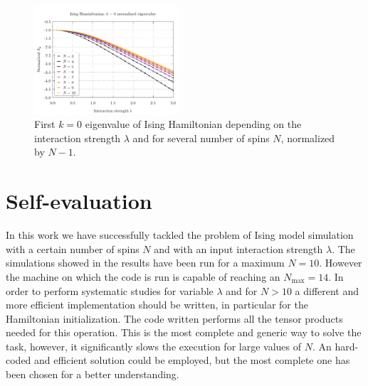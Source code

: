 \documentclass[pra, onecolumn, notitlepage, floats, 11pt]{revtex4-1}
\begin{document}
\begin{figure}[!h]
    \centering
    \includegraphics[width=0.48\textwidth]{images/ising_0_K.pdf}
    \caption{First \( k = 0 \) eigenvalue of Ising Hamiltonian depending on the interaction strength \( \lambda \) and for several number of spins \( N \), normalized by \( N - 1 \).}
    \label{fig:09_R_5}
\end{figure}





\section{Self-evaluation}
In this work we have successfully tackled the problem of Ising model simulation with a certain number of spins \( N \) and with an input interaction strength \( \lambda \). The simulations showed in the results have been run for a maximum \( N = 10 \). However the machine on which the code is run is capable of reaching an \( N_{\mathrm{max}} = 14 \). In order to perform systematic studies for variable \( \lambda \) and for \( N > 10 \) a different and more efficient implementation should be written, in particular for the Hamiltonian initialization. The code written performs all the tensor products needed for this operation. This is the most complete and generic way to solve the task, however, it significantly slows the execution for large values of \( N \). An hard-coded and efficient solution could be employed, but the most complete one has been chosen for a better understanding.
\end{document}
